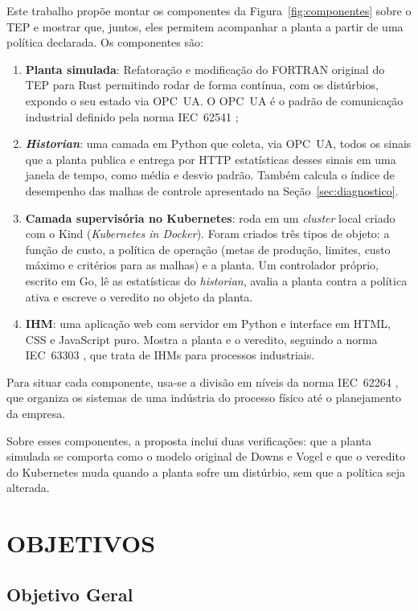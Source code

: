 Este trabalho propõe montar os componentes da Figura~\ref{fig:componentes} sobre o TEP e mostrar que, juntos, eles permitem acompanhar a planta a partir de uma política declarada. Os componentes são:

\begin{enumerate}
  \item \textbf{Planta simulada}: Refatoração e modificação do FORTRAN original do TEP para Rust permitindo rodar de forma contínua, com os distúrbios, expondo o seu estado via OPC~UA. O OPC~UA é o padrão de comunicação industrial definido pela norma IEC~62541 \cite{IEC62541_1};
  \item \textbf{\textit{Historian}}: uma camada em Python que coleta, via OPC~UA, todos os sinais que a planta publica e entrega por HTTP estatísticas desses sinais em uma janela de tempo, como média e desvio padrão. Também calcula o índice de desempenho das malhas de controle apresentado na Seção~\ref{sec:diagnostico}.
  \item \textbf{Camada supervisória no Kubernetes}: roda em um \textit{cluster} local criado com o Kind (\textit{Kubernetes in Docker}). Foram criados três tipos de objeto: a função de custo, a política de operação (metas de produção, limites, custo máximo e critérios para as malhas) e a planta. Um controlador próprio, escrito em Go, lê as estatísticas do \textit{historian}, avalia a planta contra a política ativa e escreve o veredito no objeto da planta.
  \item \textbf{IHM}: uma aplicação web com servidor em Python e interface em HTML, CSS e JavaScript puro. Mostra a planta e o veredito, seguindo a norma IEC~63303 \cite{IEC63303}, que trata de IHMs para processos industriais.
\end{enumerate}

Para situar cada componente, usa-se a divisão em níveis da norma IEC~62264 \cite{IEC62264}, que organiza os sistemas de uma indústria do processo físico até o planejamento da empresa.

Sobre esses componentes, a proposta inclui duas verificações: que a planta simulada se comporta como o modelo original de Downs e Vogel e que o veredito do Kubernetes muda quando a planta sofre um distúrbio, sem que a política seja alterada.

\section{OBJETIVOS}
\label{sec:objetivos}

\subsection{Objetivo Geral}

